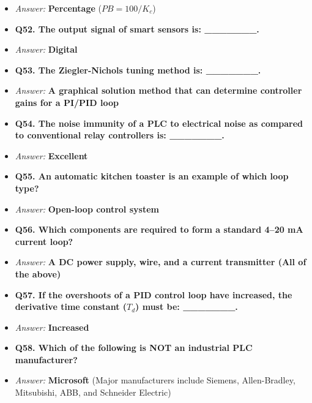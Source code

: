 \begin{itemize}
  \item \textit{Answer:} \textbf{Percentage} ($PB = 100/K_c$)
  \item \textbf{Q52. The output signal of smart sensors is: \_\_\_\_\_\_\_.}
  \item \textit{Answer:} \textbf{Digital}
  \item \textbf{Q53. The Ziegler-Nichols tuning method is: \_\_\_\_\_\_\_.}
  \item \textit{Answer:} \textbf{A graphical solution method that can determine controller gains for a PI/PID loop}
  \item \textbf{Q54. The noise immunity of a PLC to electrical noise as compared to conventional relay controllers is: \_\_\_\_\_\_\_.}
  \item \textit{Answer:} \textbf{Excellent}
  \item \textbf{Q55. An automatic kitchen toaster is an example of which loop type?}
  \item \textit{Answer:} \textbf{Open-loop control system}
  \item \textbf{Q56. Which components are required to form a standard 4–20 mA current loop?}
  \item \textit{Answer:} \textbf{A DC power supply, wire, and a current transmitter (All of the above)}
  \item \textbf{Q57. If the overshoots of a PID control loop have increased, the derivative time constant ($T_d$) must be: \_\_\_\_\_\_\_.}
  \item \textit{Answer:} \textbf{Increased}
  \item \textbf{Q58. Which of the following is NOT an industrial PLC manufacturer?}
  \item \textit{Answer:} \textbf{Microsoft} (Major manufacturers include Siemens, Allen-Bradley, Mitsubishi, ABB, and Schneider Electric)
\end{itemize}
